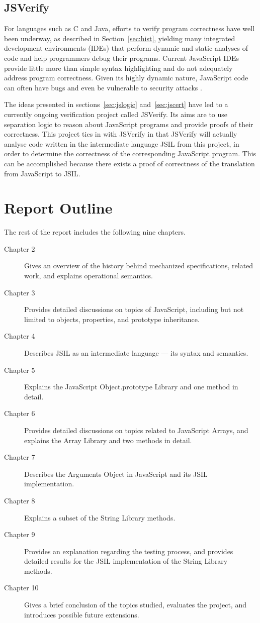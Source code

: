 \documentclass[a4paper,11pt,twoside]{report}
\begin{document}
\subsection{JSVerify}\label{sec:jsverify}
For languages such as C and Java, efforts to verify program correctness have well been underway, as described in Section~\ref{sec:hist}, yielding many integrated development environments (IDEs) that perform dynamic and static analyses of code and help programmers debug their programs. Current JavaScript IDEs provide little more than simple syntax highlighting and do not adequately address program correctness. Given its highly dynamic nature, JavaScript code can often have bugs \cite{Gardner:2012} and even be vulnerable to security attacks \cite{Lee:2007}. 

The ideas presented in sections~\ref{sec:jslogic} and~\ref{sec:jscert} have led to a currently ongoing verification project called JSVerify. Its aims are to use separation logic to reason about JavaScript programs and provide proofs of their correctness. This project ties in with JSVerify in that JSVerify will actually analyse code written in the intermediate language JSIL from this project, in order to determine the correctness of the corresponding JavaScript program. This can be accomplished because there exists a proof of correctness of the translation from JavaScript to JSIL.

\section{Report Outline}
The rest of the report includes the following nine chapters.

\begin{description}
\item[Chapter 2] Gives an overview of the history behind mechanized specifications, related work, and explains operational semantics.
\item[Chapter 3] Provides detailed discussions on topics of JavaScript, including but not limited to objects, properties, and prototype inheritance.
\item[Chapter 4] Describes JSIL as an intermediate language --- its syntax and semantics.
\item[Chapter 5] Explains the JavaScript Object.prototype Library and one method in detail.
\item[Chapter 6] Provides detailed discussions on topics related to JavaScript Arrays, and explains the Array Library and two methods in detail.
\item[Chapter 7] Describes the Arguments Object in JavaScript and its JSIL implementation.
\item[Chapter 8] Explains a subset of the String Library methods.
\item[Chapter 9] Provides an explanation regarding the testing process, and provides detailed results for the JSIL implementation of the String Library methods.
\item[Chapter 10] Gives a brief conclusion of the topics studied, evaluates the project, and introduces possible future extensions.
\end{description}
\end{document}
